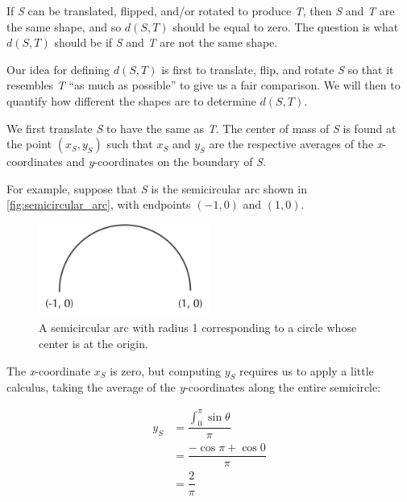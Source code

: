 If \textit{S} can be translated, flipped, and/or rotated to produce \textit{T}, then \textit{S} and \textit{T} are the same shape, and so $d(S, T)$ should be equal to zero. The question is what $d(S, T)$ should be if \textit{S} and \textit{T} are not the same shape.

Our idea for defining $d(S, T)$ is first to translate, flip, and rotate \textit{S} so that it resembles \textit{T} ``as much as possible'' to give us a fair comparison. We will then to quantify how different the shapes are to determine $d(S, T)$.

We first translate \textit{S} to have the same  as \textit{T}. The center of mass of \textit{S} is found at the point $(x_{S}, y_{S})$ such that $x_{S}$ and $y_{S}$ are the respective averages of the \textit{x}-coordinates and \textit{y}-coordinates on the boundary of \textit{S}.

For example, suppose that \textit{S} is the semicircular arc shown in \autoref{fig:semicircular_arc}, with endpoints $(-1, 0)$ and $(1, 0)$.\\

\begin{figure}[h]
	\centering
	\mySfFamily
	\includegraphics[width = 0.5\textwidth]{../images/semicircular_arc.png}
	\caption{A semicircular arc with radius 1 corresponding to a circle whose center is at the origin.}
	\label{fig:semicircular_arc}
\end{figure}

The \textit{x}-coordinate $x_{S}$ is zero, but computing $y_{S}$ requires us to apply a little calculus, taking the average of the \textit{y}-coordinates along the entire semicircle:

\begin{align*}
	y_S &= \dfrac{\int_{0}^{\pi}{\sin{\theta}}}{\pi} \\
	&= \dfrac{-\cos{\pi} + \cos{0}}{\pi} \\
	&= \dfrac{2}{\pi}
\end{align*}



